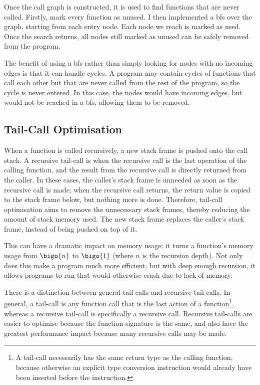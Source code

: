 \documentclass[00-main.tex]{subfiles}
\begin{document}
Once the call graph is constructed, it is used to find functions that are never called.
Firstly, mark every function as unused.
I then implemented a \gls{bfs} over the graph, starting from each entry node.
Each node we reach is marked as used.
Once the search returns, all nodes still marked as unused can be safely removed from the program.

The benefit of using a \gls{bfs} rather than simply looking for nodes with no incoming edges is that it can handle cycles.
A program may contain cycles of functions that call each other but that are never called from the rest of the program, so the cycle is never entered.
In this case, the nodes would have incoming edges, but would not be reached in a \gls{bfs}, allowing them to be removed.


\subsection{Tail-Call Optimisation}\label{sec:impl:tail-call optimisation}

When a function is called recursively, a new stack frame is pushed onto the call stack.
A recursive tail-call is when the recursive call is the last operation of the calling function, and the result from the recursive call is directly returned from the caller.
In these cases, the caller's stack frame is unneeded as soon as the recursive call is made; when the recursive call returns, the return value is copied to the stack frame below, but nothing more is done.
Therefore, tail-call optimisation aims to remove the unnecessary stack frames, thereby reducing the amount of stack memory used.
The new stack frame replaces the caller's stack frame, instead of being pushed on top of it.

This can have a dramatic impact on memory usage; it turns a function's memory usage from $\bigo{n}$ to $\bigo{1}$ (where $n$ is the recursion depth).
Not only does this make a program much more efficient, but with deep enough recursion, it allows programs to run that would otherwise crash due to lack of memory.

There is a distinction between general tail-calls and recursive tail-calls. In general, a tail-call is any function call that is the last action of a function\footnote{A tail-call necessarily has the same return type as the calling function, because otherwise an explicit type conversion instruction would already have been inserted before the  instruction.}, whereas a recursive tail-call is specifically a recursive call.
Recursive tail-calls are easier to optimise because the function signature is the same, and also have the greatest performance impact because many recursive calls may be made.
\end{document}
